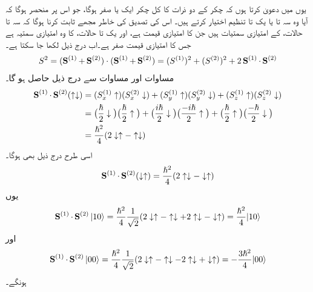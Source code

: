  یوں میں دعویٰ کرتا ہوں کہ  چکر کے دو ذرات کا کل چکر ایک  یا صفر  ہوگا، جو اس پر منحصر ہوگا کہ آیا وہ سہ تا یا یک تا تنظیم اختیار کرتے ہیں۔ اس کی تصدیق کی خاطر مجھے ثابت کرنا ہوگا کہ سہ تا حالات،  کے امتیازی سمتیات ہیں جن کا امتیازی قیمت  ہے، اور یک تا حالات،  کا وہ امتیازی سمتیہ ہے جس کا امتیازی قیمت صفر ہے۔اب درج ذیل لکھا جا سکتا ہے۔
\begin{align}\label{مساوات_تین_ابعادی_مربع_ایس_سادہ}
S^2 = (\operatorname{\mathbf{S}}^{(1)} + \operatorname{\mathbf{S}}^{(2)}) \cdot (\operatorname{\mathbf{S}}^{(1)} + \operatorname{\mathbf{S}}^{(2)}) = (S^{(1)})^2 + (S^{(2)})^2 + 2 \operatorname{\mathbf{S}}^{(1)} \cdot \operatorname{\mathbf{S}}^{(2)}
\end{align}
مساوات  اور مساوات  سے درج ذیل حاصل ہو گا۔
\begin{align*}
\operatorname{\mathbf{S}}^{(1)} \cdot \operatorname{\mathbf{S}}^{(2)} (\uparrow \downarrow) &= (S_x^{(1)} \uparrow) (S_x^{(2)} \downarrow) + (S_y^{(1)} \uparrow) (S_y^{(2)} \downarrow) + (S_z^{(1)} \uparrow) (S_z^{(2)} \downarrow) \\
&= \big ( \frac{\hslash}{2} \downarrow \big ) \big ( \frac{\hslash}{2} \uparrow \big ) + \big ( \frac{i \hslash}{2} \downarrow \big ) \big ( \frac{- i \hslash}{2} \uparrow \big ) + \big ( \frac{\hslash}{2} \uparrow \big ) \big ( \frac{- \hslash}{2} \downarrow \big ) \\
&= \frac{\hslash^2}{4} (2 \downarrow \uparrow - \uparrow \downarrow)
\end{align*}
اسی طرح درج ذیل بھی ہوگا۔
\begin{align*}
\operatorname{\mathbf{S}}^{(1)} \cdot \operatorname{\mathbf{S}}^{(2)} (\downarrow \uparrow) = \frac{\hslash^2}{4} (2 \uparrow \downarrow - \downarrow \uparrow)
\end{align*}
یوں
\begin{align}
\operatorname{\mathbf{S}}^{(1)} \cdot \operatorname{\mathbf{S}}^{(2)} | 1 0 \rangle = \frac{\hslash^2}{4} \frac{1}{\sqrt{2}} (2 \downarrow \uparrow - \uparrow \downarrow + 2 \uparrow \downarrow - \downarrow \uparrow) = \frac{\hslash^2}{4} | 1 0 \rangle
\end{align}
اور
\begin{align}
\operatorname{\mathbf{S}}^{(1)} \cdot \operatorname{\mathbf{S}}^{(2)} | 0 0 \rangle = \frac{\hslash^2}{4} \frac{1}{\sqrt{2}} (2 \downarrow \uparrow - \uparrow \downarrow - 2 \uparrow \downarrow + \downarrow \uparrow) = -\frac{3\hslash^2}{4} | 0 0 \rangle
\end{align}
ہونگے۔

